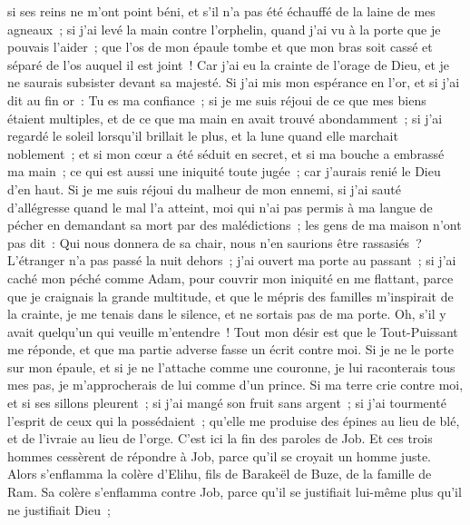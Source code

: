 \begin{multicols}{2}
si ses reins ne m'ont point béni, et s'il n'a pas été échauffé de la laine de mes agneaux~;
si j'ai levé la main contre l'orphelin, quand j'ai vu à la porte que je pouvais l'aider~;
que l'os de mon épaule tombe et que mon bras soit cassé et séparé de l'os auquel il est joint~!
Car j'ai eu la crainte de l'orage de Dieu, et je ne saurais subsister devant sa majesté. 
Si j'ai mis mon espérance en l'or, et si j'ai dit au fin or~: Tu es ma confiance~;
si je me suis réjoui de ce que mes biens étaient multiples, et de ce que ma main en avait trouvé abondamment~;
si j'ai regardé le soleil lorsqu'il brillait le plus, et la lune quand elle marchait noblement~;
et si mon cœur a été séduit en secret, et si ma bouche a embrassé ma main~; 
ce qui est aussi une iniquité toute jugée~; car j'aurais renié le Dieu d'en haut.
Si je me suis réjoui du malheur de mon ennemi, si j'ai sauté d'allégresse quand le mal l'a atteint,
moi qui n'ai pas permis à ma langue de pécher en demandant sa mort par des malédictions~;
les gens de ma maison n'ont pas dit~: Qui nous donnera de sa chair, nous n'en saurions être rassasiés~?
L'étranger n'a pas passé la nuit dehors~; j'ai ouvert ma porte au passant~;
si j'ai caché mon péché comme Adam, pour couvrir mon iniquité en me flattant,
parce que je craignais la grande multitude, et que le mépris des familles m'inspirait de la crainte, je me tenais dans le silence, et ne sortais pas de ma porte.
Oh, s'il y avait quelqu'un qui veuille m'entendre~! Tout mon désir est que le Tout-Puissant me réponde, et que ma partie adverse fasse un écrit contre moi.
Si je ne le porte sur mon épaule, et si je ne l'attache comme une couronne,
je lui raconterais tous mes pas, je m'approcherais de lui comme d'un prince.
Si ma terre crie contre moi, et si ses sillons pleurent~;
si j'ai mangé son fruit sans argent~; si j'ai tourmenté l'esprit de ceux qui la possédaient~;
qu'elle me produise des épines au lieu de blé, et de l'ivraie au lieu de l'orge. C'est ici la fin des paroles de Job.
\VerseOne{}Et ces trois hommes cessèrent de répondre à Job, parce qu'il se croyait un homme juste. 
Alors s'enflamma la colère d'Elihu, fils de Barakeël de Buze, de la famille de Ram. Sa colère s'enflamma contre Job, parce qu'il se justifiait lui-même plus qu'il ne justifiait Dieu~; 

\end{multicols}
